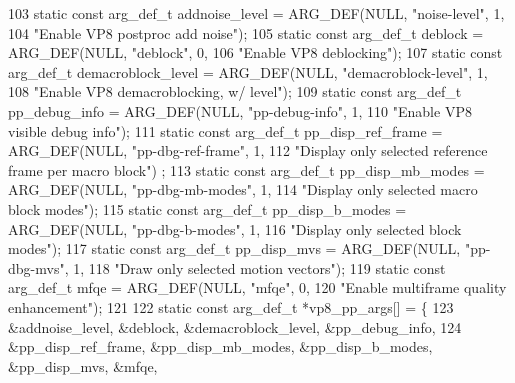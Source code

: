 \begin{DoxyCodeInclude}
103 \textcolor{keyword}{static} \textcolor{keyword}{const} arg\_def\_t addnoise\_level = ARG\_DEF(NULL, \textcolor{stringliteral}{"noise-level"}, 1,
104                                                 \textcolor{stringliteral}{"Enable VP8 postproc add noise"});
105 \textcolor{keyword}{static} \textcolor{keyword}{const} arg\_def\_t deblock = ARG\_DEF(NULL, \textcolor{stringliteral}{"deblock"}, 0,
106                                          \textcolor{stringliteral}{"Enable VP8 deblocking"});
107 \textcolor{keyword}{static} \textcolor{keyword}{const} arg\_def\_t demacroblock\_level = ARG\_DEF(NULL, \textcolor{stringliteral}{"demacroblock-level"}, 1,
108                                                     \textcolor{stringliteral}{"Enable VP8 demacroblocking, w/ level"});
109 \textcolor{keyword}{static} \textcolor{keyword}{const} arg\_def\_t pp\_debug\_info = ARG\_DEF(NULL, \textcolor{stringliteral}{"pp-debug-info"}, 1,
110                                                \textcolor{stringliteral}{"Enable VP8 visible debug info"});
111 \textcolor{keyword}{static} \textcolor{keyword}{const} arg\_def\_t pp\_disp\_ref\_frame = ARG\_DEF(NULL, \textcolor{stringliteral}{"pp-dbg-ref-frame"}, 1,
112                                                    \textcolor{stringliteral}{"Display only selected reference frame per macro block"})
      ;
113 \textcolor{keyword}{static} \textcolor{keyword}{const} arg\_def\_t pp\_disp\_mb\_modes = ARG\_DEF(NULL, \textcolor{stringliteral}{"pp-dbg-mb-modes"}, 1,
114                                                   \textcolor{stringliteral}{"Display only selected macro block modes"});
115 \textcolor{keyword}{static} \textcolor{keyword}{const} arg\_def\_t pp\_disp\_b\_modes = ARG\_DEF(NULL, \textcolor{stringliteral}{"pp-dbg-b-modes"}, 1,
116                                                  \textcolor{stringliteral}{"Display only selected block modes"});
117 \textcolor{keyword}{static} \textcolor{keyword}{const} arg\_def\_t pp\_disp\_mvs = ARG\_DEF(NULL, \textcolor{stringliteral}{"pp-dbg-mvs"}, 1,
118                                              \textcolor{stringliteral}{"Draw only selected motion vectors"});
119 \textcolor{keyword}{static} \textcolor{keyword}{const} arg\_def\_t mfqe = ARG\_DEF(NULL, \textcolor{stringliteral}{"mfqe"}, 0,
120                                       \textcolor{stringliteral}{"Enable multiframe quality enhancement"});
121 
122 \textcolor{keyword}{static} \textcolor{keyword}{const} arg\_def\_t *vp8\_pp\_args[] = \{
123   &addnoise\_level, &deblock, &demacroblock\_level, &pp\_debug\_info,
124   &pp\_disp\_ref\_frame, &pp\_disp\_mb\_modes, &pp\_disp\_b\_modes, &pp\_disp\_mvs, &mfqe,

\end{DoxyCodeInclude}
